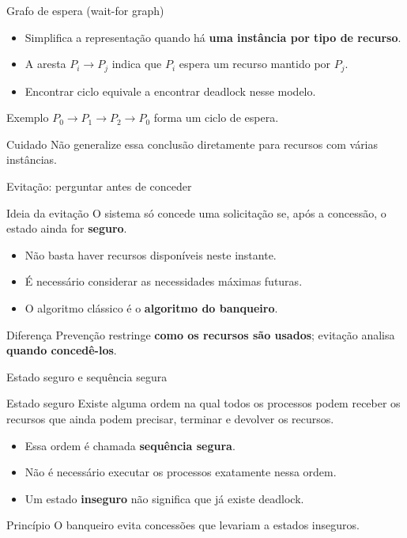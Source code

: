 \documentclass[aspectratio=169,11pt]{beamer}
\begin{document}
\begin{frame}{Grafo de espera (wait-for graph)}
\small
\begin{itemize}
\setlength\itemsep{.7em}
\item Simplifica a representação quando há \textbf{uma instância por tipo de recurso}.
\item A aresta $P_i\rightarrow P_j$ indica que $P_i$ espera um recurso mantido por $P_j$.
\item Encontrar ciclo equivale a encontrar deadlock nesse modelo.
\end{itemize}
\begin{block}{Exemplo}
$P_0\rightarrow P_1\rightarrow P_2\rightarrow P_0$ forma um ciclo de espera.
\end{block}
\begin{alertblock}{Cuidado}
Não generalize essa conclusão diretamente para recursos com várias instâncias.
\end{alertblock}
\end{frame}

\begin{frame}{Evitação: perguntar antes de conceder}
\small
\begin{block}{Ideia da evitação}
O sistema só concede uma solicitação se, após a concessão, o estado ainda for \textbf{seguro}.
\end{block}
\begin{itemize}
\item Não basta haver recursos disponíveis neste instante.
\item É necessário considerar as necessidades máximas futuras.
\item O algoritmo clássico é o \textbf{algoritmo do banqueiro}.
\end{itemize}
\begin{alertblock}{Diferença}
Prevenção restringe \textbf{como os recursos são usados}; evitação analisa \textbf{quando concedê-los}.
\end{alertblock}
\end{frame}

\begin{frame}{Estado seguro e sequência segura}
\small
\begin{block}{Estado seguro}
Existe alguma ordem na qual todos os processos podem receber os recursos que ainda podem precisar, terminar e devolver os recursos.
\end{block}
\begin{itemize}
\item Essa ordem é chamada \textbf{sequência segura}.
\item Não é necessário executar os processos exatamente nessa ordem.
\item Um estado \textbf{inseguro} não significa que já existe deadlock.
\end{itemize}
\begin{alertblock}{Princípio}
O banqueiro evita concessões que levariam a estados inseguros.
\end{alertblock}
\end{frame}
\end{document}
